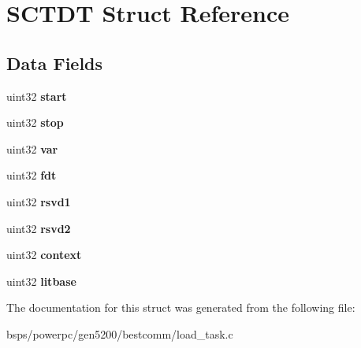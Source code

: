 \hypertarget{structSCTDT}{}\section{S\+C\+T\+DT Struct Reference}
\label{structSCTDT}
\subsection*{Data Fields}
\begin{DoxyCompactItemize}
\item 
\mbox{\label{structSCTDT_ad90fe357ec2f3225e9192d6baa00d88b}} 
uint32 {\bfseries start}
\item 
\mbox{\label{structSCTDT_a83c3513ea0108321436b159d9f82ff29}} 
uint32 {\bfseries stop}
\item 
\mbox{\label{structSCTDT_adad318d3e968f07f682f78c90209ba98}} 
uint32 {\bfseries var}
\item 
\mbox{\label{structSCTDT_aecc1bd673bcb3a18677dffd04e382c03}} 
uint32 {\bfseries fdt}
\item 
\mbox{\label{structSCTDT_a62389923e08dd1f69c2da67d2ca4776c}} 
uint32 {\bfseries rsvd1}
\item 
\mbox{\label{structSCTDT_ad44b2fd59768177f248759462c2d14c0}} 
uint32 {\bfseries rsvd2}
\item 
\mbox{\label{structSCTDT_a9ad025c6e3b688be2f9ed7461feab692}} 
uint32 {\bfseries context}
\item 
\mbox{\label{structSCTDT_ab30d09a7871911df2aee009c4ae68286}} 
uint32 {\bfseries litbase}
\end{DoxyCompactItemize}


The documentation for this struct was generated from the following file\+:\begin{DoxyCompactItemize}
\item 
bsps/powerpc/gen5200/bestcomm/load\+\_\+task.\+c\end{DoxyCompactItemize}
